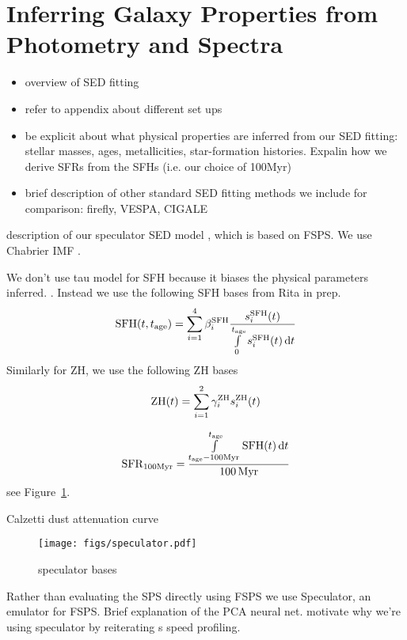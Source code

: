 \section{Inferring Galaxy Properties from Photometry and Spectra} \label{sec:methods}
\begin{itemize}
    \item overview of SED fitting
    \item refer to appendix about different set ups 
    \item be explicit about what physical properties are inferred from our SED
        fitting: stellar masses, ages, metallicities, star-formation histories.
        Expalin how we derive SFRs from the SFHs (i.e. our choice of 100Myr) 
    \item brief description of other standard SED fitting methods we include for
        comparison: firefly, VESPA, CIGALE
\end{itemize} 


description of our speculator SED model \citep{alsing2019}, which is based on
FSPS. We use Chabrier IMF . 

We don't use tau model for SFH because it biases the physical parameters
inferred. . Instead we use the
following SFH bases from Rita in prep. 
\begin{equation}
    {\rm SFH}(t, t_{\rm age}) = \sum\limits_{i=1}^{4} \beta_i^{\rm SFH}
    \frac{s_i^{\rm SFH}(t)}{\int\limits_0^{t_{\rm age}} s_i^{\rm SFH}(t) \,
    {\rm d}t}
\end{equation} 
Similarly for ZH, we use the following ZH bases 
\begin{equation}
    {\rm ZH}(t) = \sum\limits_{i=1}^2 \gamma_i^{\rm ZH} s_i^{\rm ZH}(t)
\end{equation} 

\begin{equation}
    {\rm SFR}_{100{\rm Myr}} = \frac{\int\limits_{t_{\rm age} - 100{\rm
    Myr}}^{t_{\rm age}}{\rm SFH}(t)\,{\rm d}t}{100\,{\rm Myr}}
\end{equation} 
see Figure~\ref{fig:speculator}. 

Calzetti dust attenuation curve

\begin{figure}
\begin{center}
\texttt{[image: figs/speculator.pdf]} 
\caption{speculator bases}
\label{fig:speculator}
\end{center}
\end{figure}
Rather than evaluating the SPS directly using FSPS we use {\sc Speculator}, an
emulator for FSPS. Brief explanation of the PCA neural net. motivate why we're
using speculator by reiterating \cite{alsing2019}s speed profiling. 

